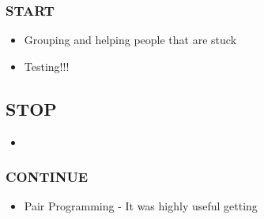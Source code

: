 \documentclass[]{report}
\begin{document}
	\subsubsection*{START}
	\begin{itemize}
		\item Grouping and helping people that are stuck
		\item Testing!!!
	\end{itemize}
	\subsection*{STOP}
	\begin{itemize}
		\item 
	\end{itemize}
	\subsubsection*{CONTINUE}
	\begin{itemize}
		\item Pair Programming - It was highly useful getting 
	\end{itemize}
	
\end{document}

